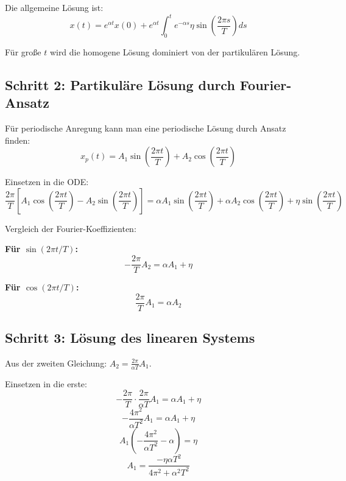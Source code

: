 \documentclass[a4paper, 12pt, twoside, openright]{report}
\theoremstyle{definition}
\theoremstyle{definition}
\begin{document}
Die allgemeine Lösung ist:
\begin{equation}
    x(t) = e^{\alpha t} x(0) + e^{\alpha t} \int_0^t e^{-\alpha s} \eta \sin\left(\frac{2\pi s}{T}\right) ds
\end{equation}

Für große $t$ wird die homogene Lösung dominiert von der partikulären Lösung.

\subsection{Schritt 2: Partikuläre Lösung durch Fourier-Ansatz}

Für periodische Anregung kann man eine periodische Lösung durch Ansatz finden:
\begin{equation}
    x_p(t) = A_1 \sin\left(\frac{2\pi t}{T}\right) + A_2 \cos\left(\frac{2\pi t}{T}\right)
\end{equation}

Einsetzen in die ODE:
\begin{equation}
    \frac{2\pi}{T} \left[A_1 \cos\left(\frac{2\pi t}{T}\right) - A_2 \sin\left(\frac{2\pi t}{T}\right)\right] = \alpha A_1 \sin\left(\frac{2\pi t}{T}\right) + \alpha A_2 \cos\left(\frac{2\pi t}{T}\right) + \eta \sin\left(\frac{2\pi t}{T}\right)
\end{equation}

Vergleich der Fourier-Koeffizienten:

\textbf{Für $\sin(2\pi t / T)$:}
\begin{equation}
    -\frac{2\pi}{T} A_2 = \alpha A_1 + \eta
\end{equation}

\textbf{Für $\cos(2\pi t / T)$:}
\begin{equation}
    \frac{2\pi}{T} A_1 = \alpha A_2
\end{equation}

\subsection{Schritt 3: Lösung des linearen Systems}

Aus der zweiten Gleichung: $A_2 = \frac{2\pi}{\alpha T} A_1$.

Einsetzen in die erste:
\begin{equation}
    -\frac{2\pi}{T} \cdot \frac{2\pi}{\alpha T} A_1 = \alpha A_1 + \eta
\end{equation}
\begin{equation}
    -\frac{4\pi^2}{\alpha T^2} A_1 = \alpha A_1 + \eta
\end{equation}
\begin{equation}
    A_1 \left(-\frac{4\pi^2}{\alpha T^2} - \alpha\right) = \eta
\end{equation}
\begin{equation}
    A_1 = \frac{-\eta \alpha T^2}{4\pi^2 + \alpha^2 T^2}
\end{equation}
\end{document}
